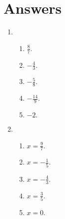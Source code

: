 \newpage

\section*{Answers}\begin{enumerate}
\item
	
	\begin{enumerate}
		\item
			${\frac{8}{7}.}$
		\item
			${- \frac{4}{3}.}$
		\item
			${- \frac{5}{8}.}$
		\item
			${- \frac{14}{9}.}$
		\item
			${- 2.}$
	\end{enumerate}

\item
	
	\begin{enumerate}
		\item
			${x = \frac{9}{7}.}$
		\item
			${x = - \frac{1}{5}.}$
		\item
			${x = - \frac{4}{3}.}$
		\item
			${x = \frac{3}{5}.}$
		\item
			${x = 0.}$
	\end{enumerate}


\end{enumerate}